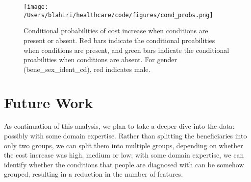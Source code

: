 \begin{figure}[!h]
    \centering
    \texttt{[image: /Users/blahiri/healthcare/code/figures/cond\_probs.png]}
    \caption{\small Conditional probabilities of cost increase when conditions are present or absent. Red bars indicate the conditional proabilities when conditions are present, and green bars indicate the conditional proabilities when conditions are absent. For gender (bene\_sex\_ident\_cd), red indicates male.}
    \label{fig:cond_probs}
\end{figure}

\section{Future Work}
\label{sec:future}
As continuation of this analysis, we plan to take a deeper dive into the data: possibly with some domain expertise. Rather than splitting the beneficiaries into only two groups, we can split them into multiple groups, depending on whether the cost increase was high, medium or low; with some domain expertise, we can identify whether the conditions that people are diagnosed with can be somehow grouped, resulting in a reduction in the number of features.   
